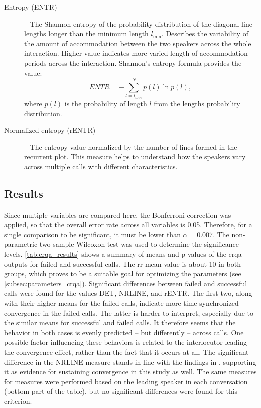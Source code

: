 \begin{description}
	\item[Entropy (ENTR)] -- The Shannon entropy of the probability distribution of the diagonal line lengths longer than the minimum length $l_{\min}$.
	Describes the variability of the amount of accommodation between the two speakers across the whole interaction.
	Higher value indicates more varied length of accommodation periods across the interaction.
	Shannon's entropy formula provides the value:
	\begin{equation}
		\label{eq:entr}
		ENTR = -\sum_{l=l_{min}}^{N} p(l) \ln p(l),
	\end{equation}
	where $p(l)$ is the probability of length $l$ from the lengths probability distribution.
	\item[Normalized entropy (rENTR)] -- The entropy value normalized by the number of lines formed in the recurrent plot.
	This measure helps to understand how the speakers vary across multiple calls with different characteristics.
\end{description}
%

\subsection{Results}
\label{subsec:results_hhi}

Since multiple variables are compared here, the Bonferroni correction \citep{Bonferroni1936teoria} was applied, so that the overall error rate across all variables is \num{0.05}.
Therefore, for a single comparison to be significant, it must be lower than $\alpha = 0.007$.
The non-parametric two-sample Wilcoxon test \citep{Wilcoxon1945individual} was used to determine the significance levels.
\cref{tab:crqa_results} shows a summary of means and p-values of the \ac{crqa} outputs for failed and successful calls.
The \ac{rr} mean value is about 10 in both groups, which proves to be a suitable goal for optimizing the parameters (see \cref{subsec:parameters_crqa}).
Significant differences between failed and successful calls were found for the values DET, NRLINE, and rENTR.
The first two, along with their higher means for the failed calls, indicate more time-synchronized convergence in the failed calls.
The latter is harder to interpret, especially due to the similar means for successful and failed calls.
It therefore seems that the behavior in both cases is evenly predicted -- but differently -- across calls.
One possible factor influencing these behaviors is related to the interlocutor leading the convergence effect, rather than the fact that it occurs at all.
The significant difference in the NRLINE measure stands in line with the findings in \citet{Borrie2019syncing}, supporting it as evidence for sustaining convergence in this study as well.
The same measures for measures were performed based on the leading speaker in each conversation (bottom part of the table), but no significant differences were found for this criterion.

